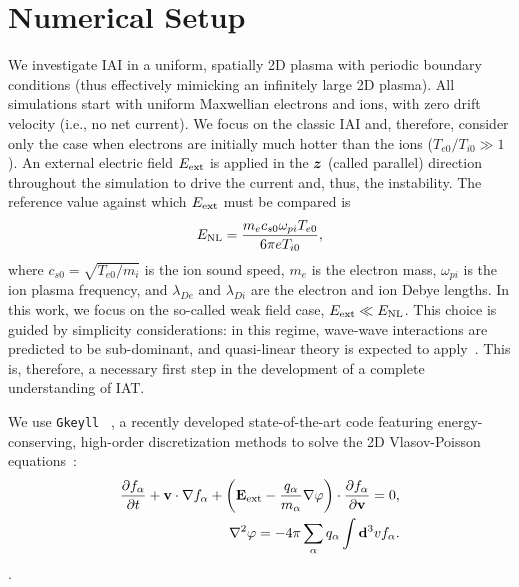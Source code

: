 \documentclass[%
 reprint,
 amsmath,
 amssymb,
 aps,
 prx,
floatfix,
superscriptaddress
]{revtex4-2}
\newcommand\bb[1]{\mbox{\boldmath{$#1$}}}
\begin{document}
\section{\label{sec:setup}Numerical Setup}
We investigate IAI in a uniform, spatially 2D plasma with periodic boundary conditions (thus effectively mimicking an infinitely large 2D plasma).
All simulations start with uniform Maxwellian electrons and ions, with zero drift velocity (i.e., no net current).
We focus on the classic IAI and, therefore, consider only the case when electrons are initially much hotter than the ions ($T_{e0}/T_{i0} \gg 1 $).
An external electric field $E_{\rm{ext}}$ is applied in the $\bb{z}$ (called parallel) direction throughout the simulation to drive the current and, thus, the instability. 
The reference value against which $E_{\rm{ext}}$ must be compared is~\cite{bychenkov1988ion}
\begin{equation}
    \label{eq:E_NL}
    E_{\rm{NL}} = \frac{m_e c_{s0} \omega_{pi} T_{e0}}{6\pi e T_{i0}},
\end{equation}
where $c_{s0} = \sqrt{T_{e0}/m_i}$ is the ion sound speed, $m_e$ is the electron mass, $\omega_{pi}$ is the ion plasma frequency, and $\lambda_{De}$ and $\lambda_{Di}$ are the electron and ion Debye lengths. 
In this work, we focus on the so-called weak field case, $E_{\rm{ext}} \ll E_{\rm{NL}}$. 
This choice is guided by simplicity considerations: in this regime, wave-wave interactions are predicted to be sub-dominant, and quasi-linear theory is expected to apply~\cite{bychenkov1988ion}. This is, therefore, a necessary first step in the development of a complete understanding of IAT. 


We use {\tt Gkeyll} ~\cite{shi2017gyrokinetic, shi2019full, mandell2020electromagnetic}, a recently developed state-of-the-art code featuring energy-conserving, high-order discretization methods to solve the 2D Vlasov-Poisson equations~\cite{Juno:2018,HakimJuno:2020}:
\begin{equation}
 \begin{aligned}
\frac{\partial f_{\alpha}}{\partial t}+\mathbf{v} \cdot \nabla f_{\alpha}+ \left(\mathbf{E_{\rm{ext}}} -  \frac{q_{\alpha}}{m_{\alpha}} \nabla \varphi \right) \cdot \frac{\partial f_{\alpha}}{\partial \mathbf{ v}}=0, \\
\nabla^{2} \varphi=-4 \pi \sum_{\alpha} q_{\alpha} \int \mathbf{d}^{3} v f_{\alpha}.
 \end{aligned}
\end{equation}. 
\end{document}
